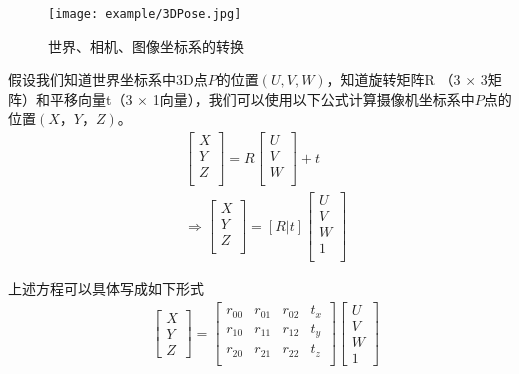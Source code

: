 \begin{figure}[!htp]
\centering
\texttt{[image: example/3DPose.jpg]}
\caption{世界、相机、图像坐标系的转换}
\label{fig1:4-8}
\end{figure}


假设我们知道世界坐标系中3D点$P$的位置$(U,V,W)$，知道旋转矩阵R （3 $\times$ 3矩阵）和平移向量t（3 $\times$ 1向量），我们可以使用以下公式计算摄像机坐标系中$P$点的位置$(X，Y，Z)$。
\begin{align}
&\begin{bmatrix} X \\ Y \\ Z \\ \end{bmatrix}
= R\begin{bmatrix} U \\ V \\ W \\ \end{bmatrix} +t \nonumber \\
&\Rightarrow \begin{bmatrix} X \\ Y\\ Z \\ \end{bmatrix}
= [R|t]\begin{bmatrix} U \\ V \\ W \\ 1 \\ \end{bmatrix}
\end{align}

上述方程可以具体写成如下形式
\begin{align}
&\begin{bmatrix}
X \\ Y \\ Z
\end{bmatrix}
= \begin{bmatrix}
r_{00} & r_{01} & r_{02} & t_x\\
r_{10} & r_{11} & r_{12} & t_y\\
r_{20} & r_{21} & r_{22} & t_z\\
\end{bmatrix}
\begin{bmatrix}
U \\ V \\ W \\ 1
\end{bmatrix}
\end{align}


